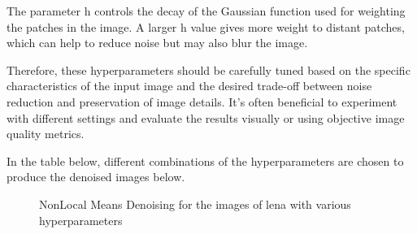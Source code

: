 \documentclass[conference]{IEEEtran}
\begin{document}
The parameter h controls the decay of the Gaussian function used for weighting the patches in the image. A larger h value gives more weight to distant patches, which can help to reduce noise but may also blur the image.

Therefore, these hyperparameters should be carefully tuned based on the specific characteristics of the input image and the desired trade-off between noise reduction and preservation of image details. It’s often beneficial to experiment with different settings and evaluate the results visually or using objective image quality metrics.

In the table below, different combinations of the hyperparameters are chosen to produce the denoised images below.
    \begin{figure}[htbp]
        \centering
        \caption{NonLocal Means Denoising for the images of lena with various hyperparameters}
    \end{figure}
\end{document}
